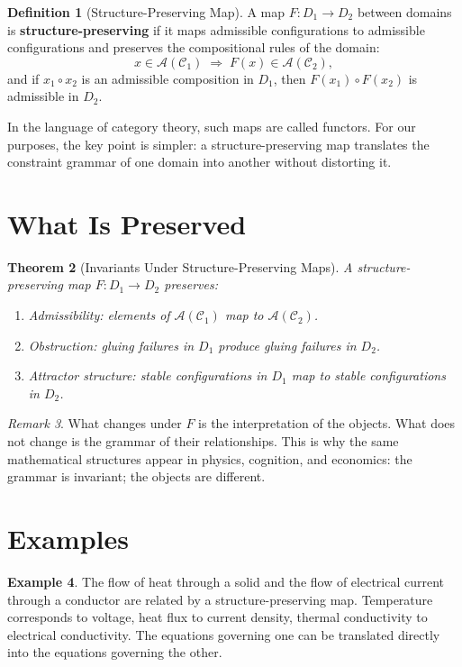 \documentclass[11pt]{book}
\theoremstyle{plain}
\newtheorem{theorem}{Theorem}[chapter]
\theoremstyle{definition}
\newtheorem{definition}[theorem]{Definition}
\newtheorem{example}[theorem]{Example}
\theoremstyle{remark}
\newtheorem{remark}[theorem]{Remark}
\newcommand{\C}{\mathcal{C}}
\newcommand{\A}{\mathcal{A}}
\begin{document}
\begin{definition}[Structure-Preserving Map]
A map $F : D_1 \to D_2$ between domains is \textbf{structure-preserving}
if it maps admissible configurations to admissible configurations and
preserves the compositional rules of the domain:
\[
  x \in \A(\C_1) \;\Rightarrow\; F(x) \in \A(\C_2),
\]
and if $x_1 \circ x_2$ is an admissible composition in $D_1$, then
$F(x_1) \circ F(x_2)$ is admissible in $D_2$.
\end{definition}

In the language of category theory, such maps are called functors. For our
purposes, the key point is simpler: a structure-preserving map translates
the constraint grammar of one domain into another without distorting it.

\section{What Is Preserved}

\begin{theorem}[Invariants Under Structure-Preserving Maps]
A structure-preserving map $F : D_1 \to D_2$ preserves:
\begin{enumerate}[label=(\roman*)]
  \item Admissibility: elements of $\A(\C_1)$ map to $\A(\C_2)$.
  \item Obstruction: gluing failures in $D_1$ produce gluing failures
        in $D_2$.
  \item Attractor structure: stable configurations in $D_1$ map to
        stable configurations in $D_2$.
\end{enumerate}
\end{theorem}

\begin{remark}
What changes under $F$ is the interpretation of the objects. What does not
change is the grammar of their relationships. This is why the same
mathematical structures appear in physics, cognition, and economics: the
grammar is invariant; the objects are different.
\end{remark}

\section{Examples}

\begin{example}
The flow of heat through a solid and the flow of electrical current through
a conductor are related by a structure-preserving map. Temperature corresponds
to voltage, heat flux to current density, thermal conductivity to electrical
conductivity. The equations governing one can be translated directly into
the equations governing the other.
\end{example}
\end{document}
